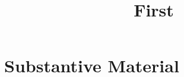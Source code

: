 

\title{First}

\date[]{}



\frame{\titlepage}

\frame{\tableofcontents}

\section{Substantive Material}

\frame{

\begin{itemize}\itemsep1em

\item

\end{itemize}

}


\appendix
\frame{}


